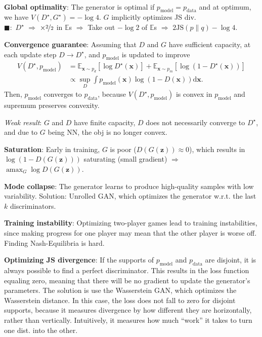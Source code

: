 \documentclass{article}
\DeclareMathOperator*{\argmax}{amax}
\newcommand{\E}{\mathbb{E}}
\renewcommand{\vec}[1]{\bm{#1}}
\newenvironment{topic}[1]
{\textbf{\sffamily \colorbox{black}{\rlap{\textbf{\textcolor{white}{#1}}}\hspace{\linewidth}\hspace{-2\fboxsep}}} \\ \vspace{0.2cm}}
{}
\begin{document}
\begin{multicols*}{2}
\begin{topic}{Generative adversarial network}
        \textbf{Global optimality}: The generator is optimal if $p_{\mathrm{model}} = p_{\mathrm{data}}$ and at optimum, we have $V(D^\star, G^\star) = -\log 4$. $G$ implicitly optimizes JS div. \\
        $\blacksquare:$ $D^\star$ $\Rightarrow$ $\times \nicefrac{2}{2}$ in $\E$s $\Rightarrow$ Take
        out $-\log 2$ of $\E$s $\Rightarrow$ $2 \mathrm{JS}(p \| q) - \log 4$.

        \textbf{Convergence guarantee}: Assuming that $D$ and $G$ have sufficient capacity, at each update step $D \to D^\star$, and $p_{\mathrm{model}}$ is updated to improve
        \begin{align*}
            V(D^\star, p_{\mathrm{model}}) & = \E_{\vec{x} \sim p_d} [\log D^\star(\vec{x})] + \E_{\vec{x} \sim p_m} [\log (1 - D^\star(\vec{x}))] \\
                                           & \propto \sup_D \int p_{\mathrm{model}}(\vec{x}) \log (1 - D(\vec{x})) \mathrm{d}\vec{x}.
        \end{align*}
        Then, $p_{\mathrm{model}}$ converges to $p_{\mathrm{data}}$, because $V(D^\star,
            p_{\mathrm{model}})$ is convex in $p_{\mathrm{model}}$ and supremum preserves convexity.

        \textit{Weak result}: $G$ and $D$ have finite capacity, $D$ does not necessarily converge to $D^\star$, and
        due to $G$ being NN, the obj is no longer convex.

        \textbf{Saturation}: Early in training, $G$ is poor ($D(G(\vec{z})) \approx 0$), which
        results in $\log (1 - D(G(\vec{z})))$ saturating (small gradient) $\Rightarrow$ $\argmax_G \log D(G(\vec{z}))$.

        \textbf{Mode collapse}: The generator learns to produce high-quality samples with low
        variability. Solution: Unrolled GAN, which optimizes the generator w.r.t. the last $k$
        discriminators.

        \textbf{Training instability}: Optimizing two-player games lead to training instabilities,
        since making progress for one player may mean that the other player is worse off. Finding
        Nash-Equilibria is hard.

        \textbf{Optimizing JS divergence}: If the supports of
        $p_{\mathrm{model}}$ and $p_{\mathrm{data}}$ are disjoint, it is always possible to find a
        perfect discriminator. This results in the loss function equaling zero, meaning that there
        will be no gradient to update the generator's parameters. The solution is use the Wasserstein
        GAN, which optimizes the Wasserstein distance. In this case, the loss does not fall to zero
        for disjoint supports, because it measures divergence by how different they are horizontally,
        rather than vertically. Intuitively, it measures how much “work” it takes to turn one
        dist. into the other.


\end{topic}
\end{multicols*}
\end{document}
